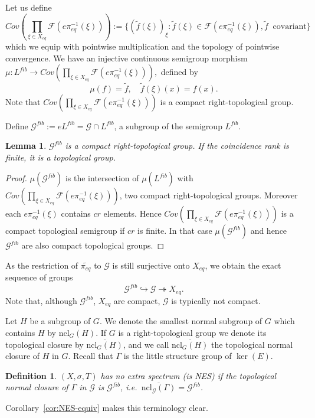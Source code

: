 \documentclass[10pt,a4paper]{amsart}
\newtheorem{lemma}[theorem]{Lemma}
\newtheorem{definition}[theorem]{Definition}
\numberwithin{equation}{section}
\newcommand{\Ff}{{\mathcal F}}
\newcommand{\Gg}{{\mathcal G}}
\newcommand{\Xe}{X_{eq}}
\newcommand{\pe}{\pi_{eq}}
\newcommand{\tpe}{\widetilde{\pe}}
\begin{document}
Let us define
\begin{equation}\label{eq-cov} 
Cov(\prod_{\xi\in \Xe} \Ff(e\pe^{-1}(\xi))):=\{(\tilde f(\xi))_\xi :\tilde f(\xi)\in \Ff(e\pe^{-1}(\xi)), \tilde f\: \mbox{ covariant}\}
\end{equation} 
which we equip with pointwise multiplication and the topology of pointwise convergence. We have an injective continuous semigroup morphism
$\mu:L^{fib}\to Cov(\prod_{\xi\in \Xe} \Ff(e\pe^{-1}(\xi))),$ defined by
\begin{equation}\label{def:mu}
\mu(f) = \tilde f,\quad \tilde f(\xi)(x) = f(x).\end{equation}Note that  $Cov(\prod_{\xi\in \Xe} \Ff(e\pe^{-1}(\xi)))$ is a  compact right-topological group.
 
Define $\Gg^{fib}:=e L^{fib}=\Gg\cap L^{fib}$, a subgroup of the semigroup $L^{fib}$. 
\begin{lemma} 
$\Gg^{fib}$ is a compact right-topological group. If the coincidence rank is finite, it is a topological group. 
\end{lemma}
\begin{proof} $\mu(\Gg^{fib})$ is the intersection of $\mu(L^{fib})$ with $Cov(\prod_{\xi\in \Xe} \Ff(e\pe^{-1}(\xi)))$, 
two compact right-topological groups. 
Moreover each $e\pe^{-1}(\xi)$ contains $cr$ elements. Hence $Cov(\prod_{\xi\in \Xe} \Ff(e\pe^{-1}(\xi)))$ is a compact topological semigroup if $cr$ is finite.
In that case $\mu(\Gg^{fib})$ and hence $\Gg^{fib}$ are also compact topological groups.
\end{proof}
As the restriction of $\tpe$ to $\Gg$ is still surjective onto $\Xe$, we obtain the exact sequence of groups
\begin{equation}\label{eq-SES}
\Gg^{fib} \hookrightarrow \Gg \twoheadrightarrow \Xe.
\end{equation} 
Note that, although  $\Gg^{fib}$, $\Xe$ are compact, $\Gg$ is typically not compact. %

Let $H$ be a subgroup of $G$. 
We denote the smallest normal subgroup of $G$ which contains $H$ by $\text{ncl}_G(H)$. If $G$ is a right-topological group we denote  its topological closure by 
$\overline{\text{ncl}_G(H)}$, and
we call $\overline{\text{ncl}_G(H)}$ the topological  normal closure of $H$ in $G$. Recall that $\Gamma$ is the little structure group of $\ker(E)$.

\begin{definition}\label{def:NES}
$(X,\sigma,T)$ {\em has no extra spectrum} (is NES) if the topological normal closure of $\Gamma$ in $\Gg$ is $\Gg^{fib}$, i.e.\ $\overline{\text{ncl}_{\Gg}(\Gamma)} = \Gg^{fib}$.
\end{definition}
 Corollary~\ref{cor:NES-equiv} makes this terminology clear.
\end{document}
